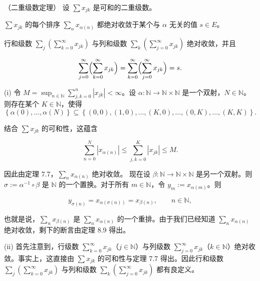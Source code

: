 \begin{theorem}

（二重级数定理） 设 $ \sum x_{jk} $ 是可和的二重级数。

\begin{subitems}
\item

$ \sum x_{jk} $ 的每个排序 $ \sum_{n} x_{\alpha(n)} $ 都绝对收敛于某个与 $ \alpha $ 无关的值 $ s \in E $。

\item

行和级数 $ \sum_j (\sum_{k=0}^{\infty} x_{jk}) $ 与列和级数 $ \sum_k (\sum_{j=0}^{\infty} x_{jk}) $ 绝对收敛，并且

\[
\sum_{j=0}^{\infty}\Bigl(\sum_{k=0}^{\infty}x_{j k}\Bigr)=\sum_{k=0}^{\infty}\Bigl(\sum_{j=0}^{\infty}x_{j k}\Bigr)=s.
\]

\proofhead
(i) 令 $ M = \sup_{n \in \mathbb{N}} \sum_{j,k=0}^{n} |x_{jk}| < \infty $。设 $ \alpha: \mathbb{N} \to \mathbb{N} \times \mathbb{N} $ 是一个双射，$ N \in \mathbb{N} $。则存在某个 $ K \in \mathbb{N} $，使得
\begin{equation}
\left\{\alpha(0),\ldots,\alpha(N)\right\}\subseteq\left\{(0,0),(1,0),\ldots,(K,0),\ldots,(0,K),\ldots,(K,K)\right\}.
\end{equation}

结合 $ \sum x_{jk} $ 的可和性，这蕴含

\[
\sum_{n=0}^{N}\left|x_{\alpha(n)}\right|\leq\sum_{j,k=0}^{K}\left|x_{j k}\right|\leq M.
\]

因此由定理 7.7，$ \sum_{n} x_{\alpha(n)} $ 绝对收敛。
现在设 $ \beta\colon \mathbb{N} \to \mathbb{N} \times \mathbb{N} $ 是另一个双射。则 $ \sigma := \alpha^{-1} \circ \beta $ 是 $ \mathbb{N} $ 的一个置换。对于所有 $ m \in \mathbb{N} $，令 $ y_m := x_{\alpha(m)} $。则

\[
y_{\sigma(n)}=x_{\alpha(\sigma(n))}=x_{\beta(n)},\qquad n\in\mathbb{N},
\]

也就是说，$ \sum_{n} x_{\beta(n)} $ 是 $ \sum_{n} x_{\alpha(n)} $ 的一个重排。由于我们已经知道 $ \sum_{n} x_{\alpha(n)} $ 绝对收敛，剩下的断言由定理 8.9 得出。

\end{subitems}

(ii) 首先注意到，行级数 $ \sum_{k=0}^{\infty} x_{jk} $（$ j \in \mathbb{N} $）与列级数 $ \sum_{j=0}^{\infty} x_{jk} $（$ k \in \mathbb{N} $）绝对收敛。事实上，这直接由 $ \sum x_{jk} $ 的可和性与定理 7.7 得出。因此行和级数 $ \sum_{j} (\sum_{k=0}^{\infty} x_{jk}) $ 与列和级数 $ \sum_{k} (\sum_{j=0}^{\infty} x_{jk}) $ 都有良定义。


\end{theorem}

